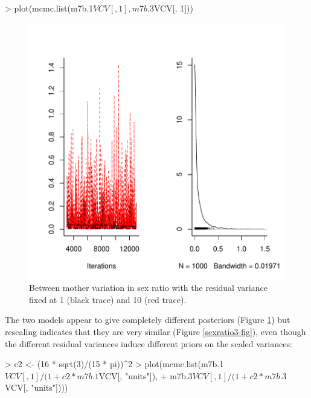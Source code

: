 \documentclass{article}
\begin{document}
\begin{Schunk}
\begin{Sinput}
> plot(mcmc.list(m7b.1$VCV[, 1], m7b.3$VCV[, 1]))
\end{Sinput}
\end{Schunk}

\begin{figure}[!h]
\begin{center}
\includegraphics{Lecture8-020}
\end{center}
\caption{Between mother variation in sex ratio with the residual variance fixed at 1 (black trace) and 10 (red trace).}
\label{sexratio2-fig}
\end{figure}

The two models appear to give completely different posteriors (Figure \ref{sexratio2-fig}) but rescaling indicates that they are very similar (Figure \ref{sexratio3-fig}), even though the different residual variances induce different priors on the scaled variances:

\begin{Schunk}
\begin{Sinput}
> c2 <- (16 * sqrt(3)/(15 * pi))^2
> plot(mcmc.list(m7b.1$VCV[, 1]/(1 + c2 * m7b.1$VCV[, "units"]), 
+     m7b.3$VCV[, 1]/(1 + c2 * m7b.3$VCV[, "units"])))
\end{Sinput}
\end{Schunk}
\end{document}
